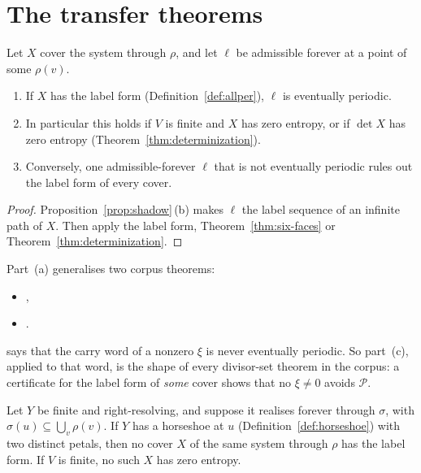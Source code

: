 \section{The transfer theorems}

\begin{theorem}[periodicity]\label{thm:transfer-per}
Let \(X\) cover the system through \(\rho\), and let \(\ell\) be admissible forever at a point
of some \(\rho(v)\).
\begin{enumerate}[label=(\alph*)]
\item If \(X\) has the label form (Definition~\ref{def:allper}), \(\ell\) is eventually
  periodic.
\item In particular this holds if \(V\) is finite and \(X\) has zero entropy, or if \(\det X\)
  has zero entropy (Theorem~\ref{thm:determinization}).
\item Conversely, one admissible-forever \(\ell\) that is not eventually periodic rules out the
  label form of every cover.
\end{enumerate}
\end{theorem}

\begin{proof}
Proposition~\ref{prop:shadow}\,(b) makes \(\ell\) the label sequence of an infinite path of
\(X\). Then apply the label form, Theorem~\ref{thm:six-faces} or
Theorem~\ref{thm:determinization}.
\end{proof}

Part~(a) generalises two corpus theorems:
\begin{itemize}
\item {},
\item {}.
\end{itemize}
\cite[Lemma~2]{DN05} says that the carry word of a
nonzero \(\xi\) is never eventually periodic. So part~(c), applied to that word, is the shape of
every divisor-set theorem in the corpus: a certificate for the label form of \emph{some} cover
shows that no \(\xi\ne0\) avoids \(\mathcal P\).

\begin{theorem}\label{thm:obstruction}
Let \(Y\) be finite and right-resolving, and suppose it realises forever through \(\sigma\), with
\(\sigma(u)\subseteq\bigcup_v\rho(v)\). If \(Y\) has a horseshoe at \(u\)
(Definition~\ref{def:horseshoe}) with two distinct petals, then no cover \(X\) of the same
system through \(\rho\) has the label form. If \(V\) is finite, no such \(X\) has zero entropy.
\end{theorem}

